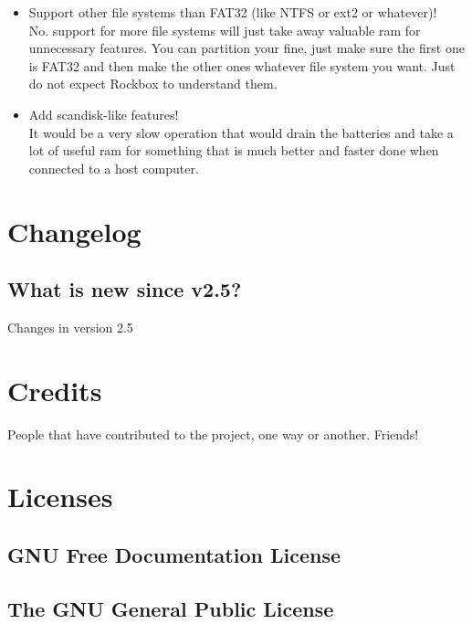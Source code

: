 \begin{itemize}
{  documentation.
}
\item Support other file systems than FAT32 (like NTFS or ext2 or whatever)!\\
  No.
  support for more file systems will just take away valuable ram for
  unnecessary features. You can partition your \dap{} fine, just make sure
  the first one is FAT32 and then make the other ones whatever file system
  you want. Just do not expect Rockbox to understand them.
\item Add scandisk{}-like features!\\
  It would be a very slow operation that would drain the batteries and
  take a lot of useful ram for something that is much better and faster
  done when connected to a host computer.
\end{itemize}

\chapter{Changelog}
\section{What is new since v2.5?}
Changes in version 2.5

\chapter{Credits}
People that have contributed to the project, one way or another. Friends!
%
\begin{multicols}{2}
\noindent\textsc{\small{}}
\end{multicols}

\chapter{Licenses}

\section{GNU Free Documentation License}

\newpage
\section{The GNU General Public License}

